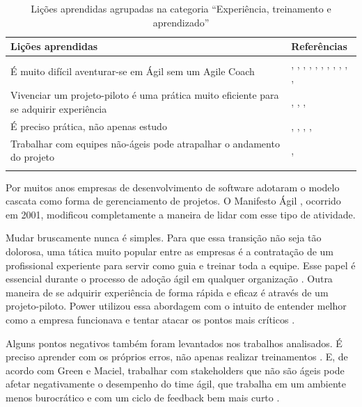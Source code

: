 \begin{table}[H]
	\centering
	\captionsetup{justification=centering}
	\begin{tabularx}{\linewidth}{ | X | p{5cm} | } \hline \textbf{Lições aprendidas} & \textbf{Referências} \\ \hline
		É muito difícil aventurar-se em Ágil sem um Agile Coach & \cite{Hajjdiab2011}, \cite{Block2011}, \cite{Adobe2012}, \cite{Cisco2011}, \cite{Lapham2012}, \cite{Eunha2012}, \cite{Claudia2013}, \cite{Stefano2013}, \cite{Rodrigues2013}, \cite{Bastos2013}, \cite{Maciel2013}, \cite{Karaj2013} \\ \hline
		Vivenciar um projeto-piloto é uma prática muito eficiente para se adquirir experiência & \cite{Hajjdiab2011}, \cite{Cisco2011}, \cite{Rodrigues2013}, \cite{Maciel2013} \\ \hline
		É preciso prática, não apenas estudo & \cite{Hajjdiab2011}, \cite{Asnawi2012}, \cite{Claudia2013}, \cite{Piegas2012}, \cite{Vieira2013} \\ \hline
		Trabalhar com equipes não-ágeis pode atrapalhar o andamento do projeto & \cite{Adobe2012}, \cite{Maciel2013} \\ \hline
	\caption{Lições aprendidas agrupadas na categoria ``Experiência, treinamento e aprendizado''}
	\end{tabularx}
\end{table}

Por muitos anos empresas de desenvolvimento de software adotaram o modelo cascata como forma de gerenciamento de projetos. O Manifesto Ágil \cite{agileManifesto}, ocorrido em 2001, modificou completamente a maneira de lidar com esse tipo de atividade.

Mudar bruscamente nunca é simples. Para que essa transição não seja tão dolorosa, uma tática muito popular entre as empresas é a contratação de um profissional experiente para servir como guia e treinar toda a equipe. Esse papel é essencial durante o processo de adoção ágil em qualquer organização \cite{Hajjdiab2011}. Outra maneira de se adquirir experiência de forma rápida e eficaz é através de um projeto-piloto. Power utilizou essa abordagem com o intuito de entender melhor como a empresa funcionava e tentar atacar os pontos mais críticos \cite{Cisco2011}.

Alguns pontos negativos também foram levantados nos trabalhos analisados. É preciso aprender com os próprios erros, não apenas realizar treinamentos \cite{Piegas2012}. E, de acordo com Green e Maciel, trabalhar com stakeholders que não são ágeis pode afetar negativamente o desempenho do time ágil, que trabalha em um ambiente menos burocrático e com um ciclo de feedback bem mais curto \cite{Adobe2012,Maciel2013}.

